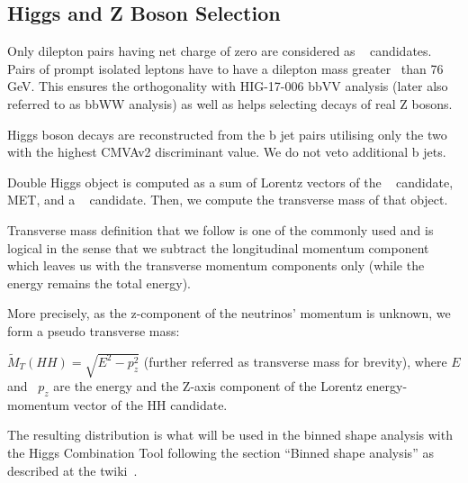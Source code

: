 \subsection{Higgs and Z Boson Selection}

Only dilepton pairs having net charge of zero are considered as \ZtoLL~ candidates. 
Pairs of prompt isolated leptons have to have a dilepton mass greater \
than 76 GeV. This ensures the orthogonality with HIG-17-006 bbVV analysis (later also referred to as bbWW analysis) as well as helps selecting decays of real Z bosons.

Higgs boson decays are reconstructed from the b jet pairs utilising only the two with the highest CMVAv2 discriminant value. We do not veto additional b jets. 

Double Higgs object is computed as a sum of Lorentz vectors of the \ZtoLL~ candidate, MET, and a \HBB~ candidate. Then, we compute the transverse mass of that object.

Transverse mass definition that we follow is one of the commonly used and is logical in the sense that we subtract the longitudinal momentum component which leaves us with the transverse momentum components only (while the energy remains the total energy).

More precisely, as the z-component of the neutrinos' momentum is unknown, we form a pseudo transverse mass:

                                                                                                                                                                       

$\tilde{M}_T(HH) = \sqrt{E^2 - p_{z}^2}$ (further referred as transverse mass for brevity), where $E$ and \
$p_z$ are the energy and the Z-axis component of the Lorentz energy-momentum vector of the HH candidate.

The resulting distribution is what will be used in the binned shape analysis with the Higgs Combination Tool following the section ``Binned shape analysis'' as described at the twiki~\cite{CombinedLimit}.


